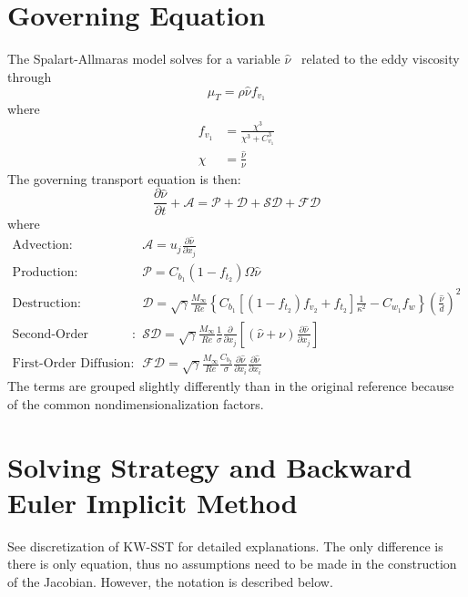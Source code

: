 \documentclass{SelimArticle}
\begin{document}
\maketitle
\newcommand{\sa}{\ensuremath{\hat{\nu}}}
\newcommand{\diff}[2]{\ensuremath{
    \frac{\partial #1}{\partial #2}
}}
\newcommand{\cmu}{\ensuremath{
    \sqrt{\gamma}\frac{M_\infty}{\mathit{Re}}
}}
\section{Governing Equation}
The Spalart-Allmaras model solves for a variable \sa ~ related to the eddy viscosity
through
\begin{equation}
    \mu_T = \rho\sa f_{v_1}
\end{equation}
where
\begin{align}
    f_{v_1} &= \frac{\chi^3}{\chi^3 + C_{v_1}^3}\\
    \chi &= \frac{\sa}{\nu}
\end{align}
The governing transport equation is then:
\begin{equation}
    \diff{\sa}{t} + \mathcal{A} = \mathcal{P} + \mathcal{D} + \mathcal{SD} + \mathcal{FD}
\end{equation}
where
\begin{align}
    \text{Advection} :\quad &\mathcal{A} = u_j\diff{\sa}{x_j}\\
    \text{Production} :\quad &\mathcal{P} = C_{b_1}(1 - f_{t_2})\Omega\sa\\
    \text{Destruction} :\quad &\mathcal{D} = \cmu\left\{
        C_{b_1}\left[(1 - f_{t_2})f_{v_2} + f_{t_2}\right]\frac{1}{\kappa^2} - C_{w_1}f_w
    \right\} \left(\frac{\sa}{d}\right)^2
    \\
    \text{Second-Order Diffusion} :\quad &\mathcal{SD} = \cmu \frac{1}{\sigma}\diff{}{x_j}\left[
            \left(\sa + \nu\right)\diff{\sa}{x_j}
    \right]
    \\
    \text{First-Order Diffusion} :\quad &\mathcal{FD} = \cmu \frac{C_{b_2}}{\sigma}
        \diff{\sa}{x_i}\diff{\sa}{x_i}
\end{align}
The terms are grouped slightly differently than in the original reference because of the common
nondimensionalization factors.

\section{Solving Strategy and Backward Euler Implicit Method}
See discretization of KW-SST for detailed explanations.
The only difference is there is only equation, thus no assumptions
need to be made in the construction of the Jacobian.  However, the notation is described below.
\end{document}
